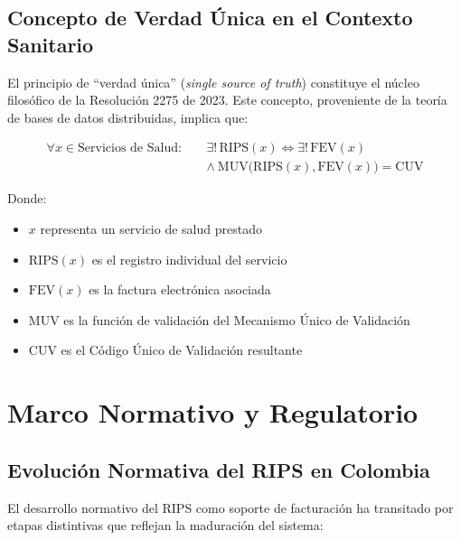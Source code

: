 \documentclass[12pt,letterpaper]{report}
\begin{document}
\subsection{Concepto de Verdad Única en el Contexto Sanitario}

El principio de ``verdad única'' (\textit{single source of truth}) constituye el núcleo filosófico de la Resolución 2275 de 2023. Este concepto, proveniente de la teoría de bases de datos distribuidas, implica que:

\begin{equation}
\begin{split}
\forall x \in \text{Servicios de Salud}: \quad &\exists!\,\text{RIPS}(x) \iff \exists!\,\text{FEV}(x) \\
&\land\ \text{MUV}\bigl(\text{RIPS}(x), \text{FEV}(x)\bigr) = \text{CUV}
\end{split}
\end{equation}

Donde:
\begin{itemize}
    \item $x$ representa un servicio de salud prestado
    \item $\text{RIPS}(x)$ es el registro individual del servicio
    \item $\text{FEV}(x)$ es la factura electrónica asociada
    \item $\text{MUV}$ es la función de validación del Mecanismo Único de Validación
    \item $\text{CUV}$ es el Código Único de Validación resultante
\end{itemize}

\section{Marco Normativo y Regulatorio}

\subsection{Evolución Normativa del RIPS en Colombia}

El desarrollo normativo del RIPS como soporte de facturación ha transitado por etapas distintivas que reflejan la maduración del sistema:
\end{document}
